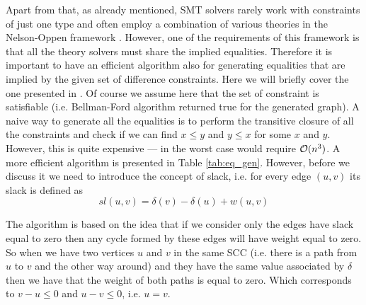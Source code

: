 Apart from that, as already mentioned, SMT solvers rarely work with constraints
of just one type and often employ a combination of various theories in the
Nelson-Oppen framework \cite{bib:nelson_oppen}. However, one of the requirements
of this framework is that all the theory solvers must share the implied
equalities. Therefore it is important to have an efficient algorithm also for
generating equalities that are implied by the given set of difference
constraints. Here we will briefly cover the one presented in \cite{bib:ms_dl}.
Of course we assume here that the set of constraint is satisfiable (i.e.
Bellman-Ford algorithm returned true for the generated graph). A naive way to
generate all the equalities is to perform the transitive closure of all the
constraints and check if we can find $x \leq y$ and $y \leq x$ for some $x$ and
$y$. However, this is quite expensive --- in the worst case would require
$\mathcal{O}(n^3)$. A more efficient algorithm is presented in Table \ref{tab:eq_gen}.
However, before we discuss it we need to introduce the concept of slack, i.e.
for every edge $(u, v)$ its slack is defined as
\[
sl(u, v) = \delta(v) - \delta(u) + w(u, v)
\]

The algorithm is based on the idea that if we consider only the edges have slack
equal to zero then any cycle formed by these edges will have weight equal to
zero. So when we have two vertices $u$ and $v$ in the same SCC (i.e. there is a
path from $u$ to $v$ and the other way around) and they have the same value
associated by $\delta$ then we have that the weight of both paths is equal to
zero. Which corresponds to $v - u \leq 0$ and $u - v \leq 0$, i.e. $u = v$.
